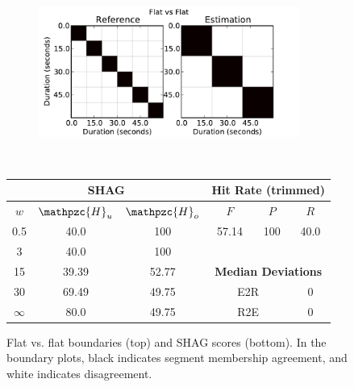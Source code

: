 \documentclass{article}
\def\shag{\ensuremath{\mathpzc{H}}}
\begin{document}
\begin{figure}
  \centering
  \begin{subfigure}{0.5\textwidth}
    \centering
    \includegraphics[width=0.94\textwidth]{plots/flat-flat.pdf}
  \end{subfigure}%
  \\
  \begin{minipage}{0.5\textwidth}
    \centering
    \vspace{10pt}
    \begin{tabular}{|c|c|c||c|c|c|}
      \hline
      \multicolumn{3}{|c||}{\textbf{SHAG}} & \multicolumn{3}{c|}{\textbf{Hit Rate (trimmed)}} \\
      \hline
      $w$ & $\shag_u$   & $\shag_o$ & $F$     & $P$     & $R$ \\
      \hline
      0.5       & 40.0   & 100   & 57.14  & 100 & 40.0 \\
      \cline{4-6}
      3         & 40.0   & 100  \\
      \cline{4-6}
      15        & 39.39  & 52.77 & \multicolumn{3}{c|}{\textbf{Median Deviations}}   \\
      \cline{4-6}
      30        & 69.49  & 49.75 & \multicolumn{2}{c|}{E2R} & 0 \\
      $\infty$  & 80.0   & 49.75 & \multicolumn{2}{c|}{R2E} & 0 \\  
      \hline
    \end{tabular}
  \end{minipage}
  \caption{Flat vs. flat boundaries (top) and SHAG scores (bottom).  In the boundary plots, black indicates segment membership agreement, and white indicates disagreement.}
  \label{fig:flat-flat}
\end{figure}
\end{document}
